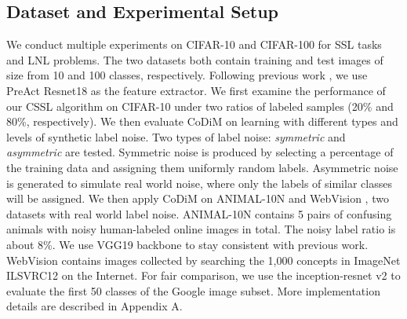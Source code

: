\documentclass[letterpaper]{article} \usepackage{aaai22}  \usepackage{times}  \usepackage{helvet}  \usepackage{courier}  \usepackage[hyphens]{url}  \usepackage{graphicx} \usepackage{subfigure}
\begin{document}
\subsection{Dataset and Experimental Setup}
We conduct multiple experiments on CIFAR-10 and CIFAR-100 \cite{krizhevsky2009learning} for SSL tasks and LNL problems. The two datasets both contain  training and  test images of size  from 10 and 100 classes, respectively. Following previous work \cite{li2020dividemix}, we use PreAct Resnet18 as the feature extractor. We first examine the performance of our CSSL algorithm on CIFAR-10 under two ratios of labeled samples (20\% and 80\%, respectively). We then evaluate CoDiM on learning with different types and levels of synthetic label noise. Two types of label noise: \textit{symmetric} and \textit{asymmetric} are tested. Symmetric noise is produced by selecting a percentage of the training data and assigning them uniformly random labels. Asymmetric noise is generated to simulate real world noise, where only the labels of similar classes will be assigned. We then apply CoDiM on ANIMAL-10N \cite{song2019selfie} and WebVision \cite{li2017webvision}, two datasets with real world label noise. ANIMAL-10N contains 5 pairs of confusing animals with  noisy human-labeled online images in total. The noisy label ratio is about 8\%. We use VGG19 backbone to stay consistent with previous work. WebVision contains  images collected by searching the 1,000 concepts in ImageNet ILSVRC12 on the Internet. For fair comparison, we use the inception-resnet v2 to evaluate the first 50 classes of the Google image subset. More implementation details are described in Appendix A.
\end{document}
